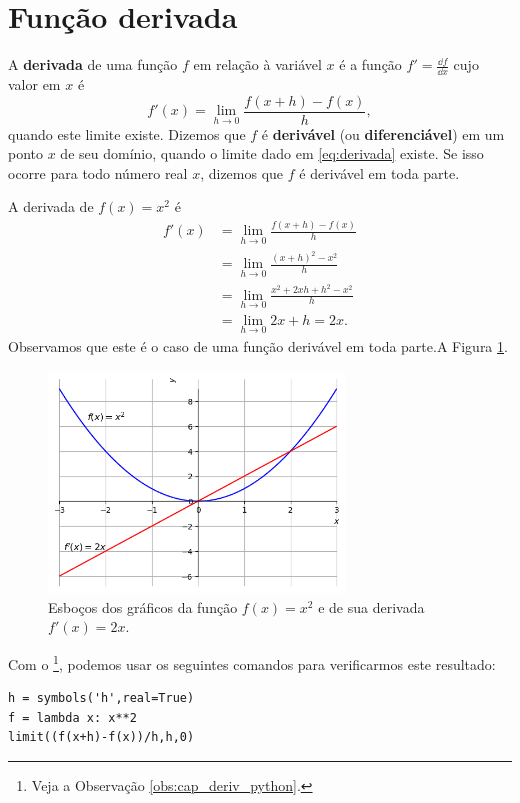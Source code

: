 \section{Função derivada}\label{cap_deriv_sec_funder}

A {\bf derivada} de uma função $f$ em relação à variável $x$ é a função $\displaystyle f' = \frac{\dd f}{\dd x}$ cujo valor em $x$ é
\begin{equation}\label{eq:derivada}
  f'(x) = \lim_{h\to 0} \frac{f(x+h)-f(x)}{h},
\end{equation}
quando este limite existe. Dizemos que $f$ é {\bf derivável} (ou {\bf diferenciável}) em um ponto $x$ de seu domínio, quando o limite dado em \eqref{eq:derivada} existe. Se isso ocorre para todo número real $x$, dizemos que $f$ é derivável em toda parte.

\begin{ex}
  A derivada de $f(x) = x^2$ é
  \begin{align}
    f'(x) &= \lim_{h\to 0} \frac{f(x+h)-f(x)}{h}\\
          &= \lim_{h\to 0} \frac{(x+h)^2 - x^2}{h}\\
          &= \lim_{h\to 0} \frac{x^2+2xh+h^2-x^2}{h}\\
          &= \lim_{h\to 0} 2x+h = 2x.
  \end{align}
  Observamos que este é o caso de uma função derivável em toda parte.A Figura \ref{fig:deriv_ex_ffl_x2}.

  \begin{figure}[H]
    \centering
    \includegraphics[width=0.7\textwidth]{./cap_deriv/dados/fig_deriv_ex_ffl_x2/fig_deriv_ex_ffl_x2}
    \caption{Esboços dos gráficos da função $f(x)=x^2$ e de sua derivada $f'(x) = 2x$.}
    \label{fig:deriv_ex_ffl_x2}
  \end{figure}  
  
  \ifispython
  Com o \sympy\footnote{Veja a Observação \ref{obs:cap_deriv_python}.}, podemos usar os seguintes comandos para verificarmos este resultado:
\begin{verbatim}
h = symbols('h',real=True)
f = lambda x: x**2
limit((f(x+h)-f(x))/h,h,0)
\end{verbatim}


\end{ex}
